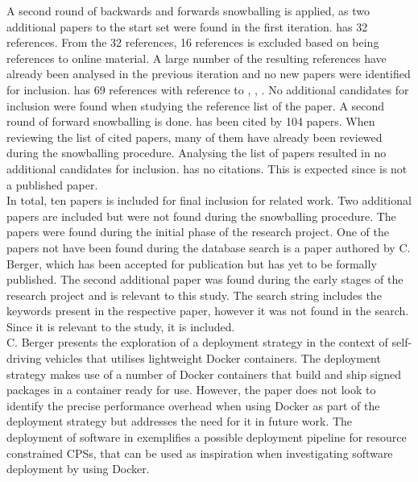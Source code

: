 A second round of backwards and forwards snowballing is applied, as two additional papers to the start set were found in the first iteration.\cite{p9} has 32 references. From the 32 references, 16 references is excluded based on being references to online material. A large number of the resulting references have already been analysed in the previous iteration and no new papers were identified for inclusion. \cite{p10} has 69 references with reference to \cite{p9}, \cite{p4}, \cite{p6}. No additional candidates for inclusion were found when studying the reference list of the paper. A second round of forward snowballing is done. \cite{p9} has been cited by 104 papers. When reviewing the list of cited papers, many of them have already been reviewed during the snowballing procedure.  Analysing the list of papers resulted in no additional candidates for inclusion. \cite{p10} has no citations. This is expected since \cite{p10} is not a published paper. \\

In total, ten papers is included for final inclusion for related work. Two additional papers are included but were not found during the snowballing procedure. The papers were found during the initial phase of the research project. One of the papers not have been found during the database search is a paper authored by C. Berger, which has been accepted for publication but has yet to be formally published. The second additional paper was found during the early stages of the research project and is relevant to this study. The search string includes the keywords present in the respective paper, however it was not found in the search. Since it is relevant to the study, it is included. \\


C. Berger \cite{cberger} presents the exploration of a deployment strategy in the context of self-driving vehicles that utilises lightweight Docker containers. The deployment strategy makes use of a number of Docker containers that build and ship signed packages in a container ready for use. However, the paper does not look to identify the precise performance overhead when using Docker as part of the deployment strategy but addresses the need for it in future work. The deployment of software in \cite{cberger} exemplifies a possible deployment pipeline for resource constrained CPSs, that can be used as inspiration when investigating software deployment by using Docker.\\

